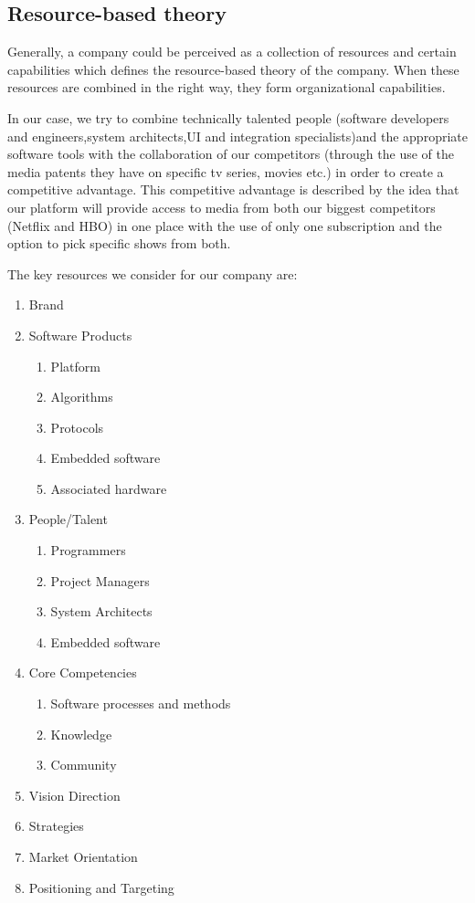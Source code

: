 \subsection{Resource-based theory}

Generally, a company could be perceived as a collection of resources and certain capabilities which defines the resource-based theory of the company.
When these resources are combined in the right way, they form organizational capabilities.

In our case, we try to combine technically talented people (software developers and engineers,system architects,UI and integration specialists)and the appropriate software tools with the collaboration of our competitors (through the use of the media patents they have on specific tv series, movies etc.) in order to create a competitive advantage. This competitive advantage is described by the idea that our platform will provide access to media from both our biggest competitors (Netflix and HBO) in one place with the use of only one subscription and the option to pick specific shows from both.

The key resources we consider for our company are:

\begin{enumerate}
  \item Brand
  \item Software Products
  	\begin{enumerate}
   		\item Platform
   		\item Algorithms  	
    	\item Protocols
    	\item Embedded software
    	\item Associated hardware
  	\end{enumerate}
  \item People/Talent
  	\begin{enumerate}
      	\item Programmers
      	\item Project Managers
      	\item System Architects
      	\item Embedded software
    \end{enumerate}
  \item Core Competencies
  	\begin{enumerate}
        	\item Software processes and methods
        	\item Knowledge
        	\item Community
    \end{enumerate}
  \item Vision Direction
  \item Strategies
  \item Market Orientation
  \item Positioning and Targeting
\end{enumerate}

